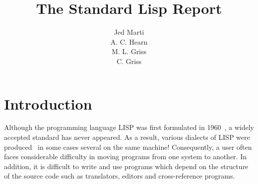 \title{The Standard Lisp Report}
\date{}
\author{Jed Marti \\ A. C. Hearn \\ M. L. Griss \\ C. Griss}

\newlength{\argwidth}                  %
\setlength{\argwidth}{4in}
\newlength{\dewidth}
\setlength{\dewidth}{4.5in}             %

\newcommand{\de}[4]
{\vspace{.25in} \noindent
\begin{minipage}[t]{\textwidth} \index{#1} {\f{#1}}{#2}\hfill{\em #3} \\
\hspace*{.25in}\begin{minipage}[t]{\dewidth} #4 \end{minipage}
\end{minipage} }

\newcommand{\variable}[4]
{\vspace{.25in} \noindent
\begin{minipage}[t]{\textwidth} \index{#1 (#3)} {\bf #1} = #2 \hfill {\em #3}
 \\
\hspace*{.25in} \ \begin{minipage}[t]{\dewidth} #4 \end{minipage}
\end{minipage}}

\newcommand{\errormessage}[1]
{\vspace{.1in} \noindent {\tt #1} \\ \vspace{.1in}}


\newcommand{\p}[1] {{\bf #1}}
\newcommand{\ty}[1] {{\em #1}}

\maketitle

\section{Introduction}
Although the programming language LISP was first formulated in
1960~\cite{LISP1.5}, a widely accepted standard has never appeared. As
a result, various dialects of LISP were
produced~\cite{CDC-LISP,LISP/360,MACLISP,Interlisp,LISPF1,LISP1.6} in
some cases several on the same machine! Consequently, a user often
faces considerable difficulty in moving programs from one system to
another. In addition, it is difficult to write and use programs which
depend on the structure of the source code such as translators,
editors and cross-reference programs.

